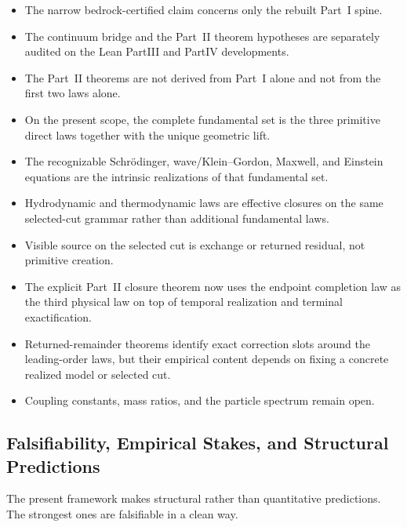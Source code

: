 \begin{tcolorbox}[colback=white, colframe=black!70, title={Present scope at a glance}]
\begin{itemize}[itemsep=0.2em, leftmargin=1.5em]
\item The narrow bedrock-certified claim concerns only the rebuilt Part~I spine.
\item The continuum bridge and the Part~II theorem hypotheses are separately audited on the Lean PartIII and PartIV developments.
\item The Part~II theorems are not derived from Part~I alone and not from the first two laws alone.
\item On the present scope, the complete fundamental set is the three primitive direct laws together with the unique geometric lift.
\item The recognizable Schr\"odinger, wave/Klein--Gordon, Maxwell, and Einstein equations are the intrinsic realizations of that fundamental set.
\item Hydrodynamic and thermodynamic laws are effective closures on the same selected-cut grammar rather than additional fundamental laws.
\item Visible source on the selected cut is exchange or returned residual, not primitive creation.
\item The explicit Part~II closure theorem now uses the endpoint completion law as the third physical law on top of temporal realization and terminal exactification.
\item Returned-remainder theorems identify exact correction slots around the leading-order laws, but their empirical content depends on fixing a concrete realized model or selected cut.
\item Coupling constants, mass ratios, and the particle spectrum remain open.
\end{itemize}
\end{tcolorbox}

\subsection{Falsifiability, Empirical Stakes, and Structural Predictions}

The present framework makes structural rather than quantitative predictions.
The strongest ones are falsifiable in a clean way.

